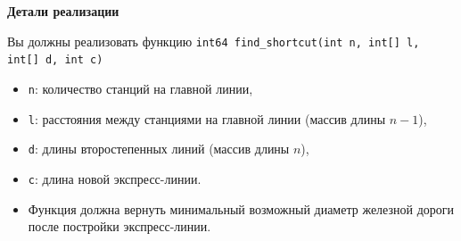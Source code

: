 \textbf{Детали реализации}

Вы должны реализовать функцию \texttt{int64 find\_shortcut(int n, int[] l, int[] d, int c)}

\begin{itemize}
\item \texttt{n}: количество станций на главной линии,
\item \texttt{l}: расстояния между станциями на главной линии (массив длины $n - 1$),
\item \texttt{d}: длины второстепенных линий (массив длины $n$),
\item \texttt{c}: длина новой экспресс-линии.
\item Функция должна вернуть минимальный возможный диаметр железной дороги после постройки экспресс-линии.
\end{itemize}
